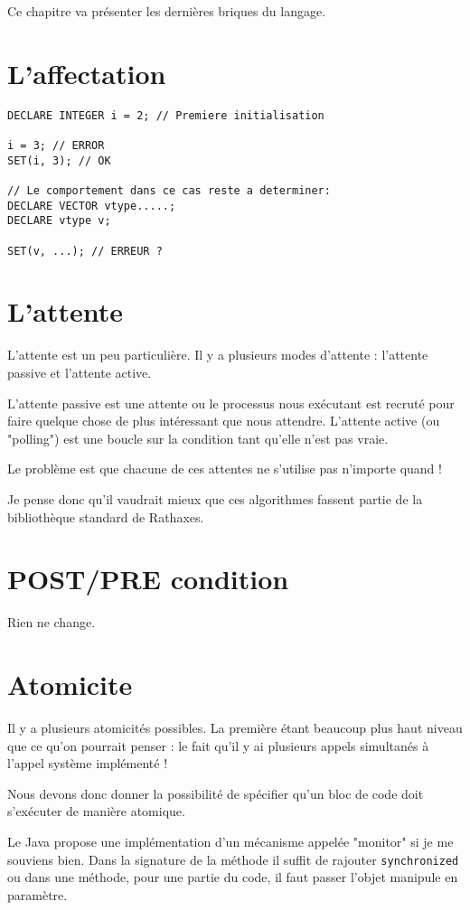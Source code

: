 \documentclass{rtxreport}
\begin{document}
Ce chapitre va présenter les dernières briques du langage.

\section{L'affectation}
\begin{lstlisting}
DECLARE INTEGER i = 2; // Premiere initialisation

i = 3; // ERROR
SET(i, 3); // OK

// Le comportement dans ce cas reste a determiner:
DECLARE VECTOR vtype.....;
DECLARE vtype v;

SET(v, ...); // ERREUR ?
\end{lstlisting}

\section{L'attente}

L’attente est un peu particulière. Il y a plusieurs modes d’attente : l’attente
passive et l’attente active.

L’attente passive est une attente ou le processus nous exécutant est recruté
pour faire quelque chose de plus intéressant que nous attendre. L’attente
active (ou "polling") est une boucle sur la condition tant qu’elle n’est pas
vraie.

Le problème est que chacune de ces attentes ne s’utilise pas n’importe quand !

Je pense donc qu’il vaudrait mieux que ces algorithmes fassent partie de la
bibliothèque standard de Rathaxes.

\section{POST/PRE condition}

Rien ne change.

\section{Atomicite}
Il y a plusieurs atomicités possibles. La première étant beaucoup plus haut
niveau que ce qu’on pourrait penser : le fait qu’il y ai plusieurs appels
simultanés à l’appel système implémenté !

Nous devons donc donner la possibilité de spécifier qu’un bloc de code doit
s’exécuter de manière atomique.

Le Java propose une implémentation d’un mécanisme appelée "monitor" si je me
souviens bien. Dans la signature de la méthode il suffit de rajouter
\texttt{synchronized} ou dans une méthode, pour une partie du code, il faut
passer l’objet manipule en paramètre.
\end{document}
